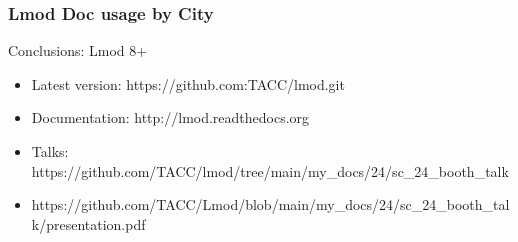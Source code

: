 \documentclass{beamer}
\begin{document}
\begin{frame}[fragile]
    \frametitle{Lmod Doc usage by City}
\end{frame}

\begin{frame}{Conclusions: Lmod 8+}
  \begin{itemize}
    \item Latest version: https://github.com:TACC/lmod.git
    \item Documentation:  http://lmod.readthedocs.org
    \item Talks:          https://github.com/TACC/lmod/tree/main/my\_docs/24/sc\_24\_booth\_talk
    \item https://github.com/TACC/Lmod/blob/main/my\_docs/24/sc\_24\_booth\_talk/presentation.pdf
  \end{itemize}
\end{frame}
\end{document}
